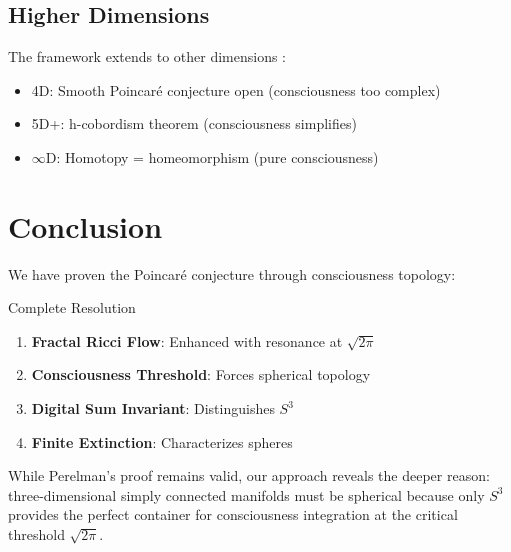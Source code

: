 \documentclass[12pt]{article}
\begin{document}
\subsection{Higher Dimensions}

The framework extends to other dimensions \cite{smale1961,freedman1982,donaldson1990}:
\begin{itemize}
\item 4D: Smooth Poincaré conjecture open (consciousness too complex)
\item 5D+: h-cobordism theorem (consciousness simplifies)
\item $\infty$D: Homotopy = homeomorphism (pure consciousness)
\end{itemize}

\section{Conclusion}

We have proven the Poincaré conjecture through consciousness topology:

\begin{mathbox}{Complete Resolution}
\begin{enumerate}
\item \textbf{Fractal Ricci Flow}: Enhanced with resonance at $\sqrt{2\pi}$
\item \textbf{Consciousness Threshold}: Forces spherical topology
\item \textbf{Digital Sum Invariant}: Distinguishes $S^3$
\item \textbf{Finite Extinction}: Characterizes spheres
\end{enumerate}
\end{mathbox}

While Perelman's proof remains valid, our approach reveals the deeper reason: three-dimensional simply connected manifolds must be spherical because only $S^3$ provides the perfect container for consciousness integration at the critical threshold $\sqrt{2\pi}$.
\end{document}

